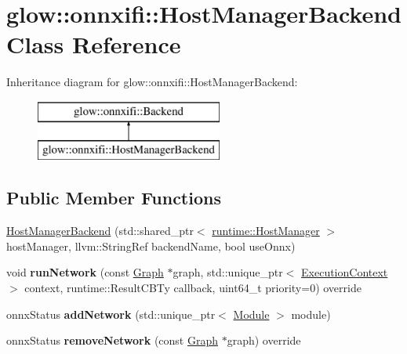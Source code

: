 \hypertarget{classglow_1_1onnxifi_1_1_host_manager_backend}{}\section{glow\+:\+:onnxifi\+:\+:Host\+Manager\+Backend Class Reference}
\label{classglow_1_1onnxifi_1_1_host_manager_backend}
Inheritance diagram for glow\+:\+:onnxifi\+:\+:Host\+Manager\+Backend\+:\begin{figure}[H]
\begin{center}
\leavevmode
\includegraphics[height=2.000000cm]{classglow_1_1onnxifi_1_1_host_manager_backend}
\end{center}
\end{figure}
\subsection*{Public Member Functions}
\begin{DoxyCompactItemize}
\item 
\hyperlink{classglow_1_1onnxifi_1_1_host_manager_backend_a1e685c23b29ab980ca2636c4b828b854}{Host\+Manager\+Backend} (std\+::shared\+\_\+ptr$<$ \hyperlink{classglow_1_1runtime_1_1_host_manager}{runtime\+::\+Host\+Manager} $>$ host\+Manager, llvm\+::\+String\+Ref backend\+Name, bool use\+Onnx)
\item 
\mbox{\label{classglow_1_1onnxifi_1_1_host_manager_backend_a7cf556d12833649b0b7b356ef2c14a07}} 
void {\bfseries run\+Network} (const \hyperlink{classglow_1_1onnxifi_1_1_graph}{Graph} $\ast$graph, std\+::unique\+\_\+ptr$<$ \hyperlink{classglow_1_1_execution_context}{Execution\+Context} $>$ context, runtime\+::\+Result\+C\+B\+Ty callback, uint64\+\_\+t priority=0) override
\item 
\mbox{\label{classglow_1_1onnxifi_1_1_host_manager_backend_a759c6e790e0792d6c6b0afc0a61d89e9}} 
onnx\+Status {\bfseries add\+Network} (std\+::unique\+\_\+ptr$<$ \hyperlink{classglow_1_1_module}{Module} $>$ module)
\item 
\mbox{\label{classglow_1_1onnxifi_1_1_host_manager_backend_addffbb489897fb74a169c6491a249183}} 
onnx\+Status {\bfseries remove\+Network} (const \hyperlink{classglow_1_1onnxifi_1_1_graph}{Graph} $\ast$graph) override
\end{DoxyCompactItemize}
